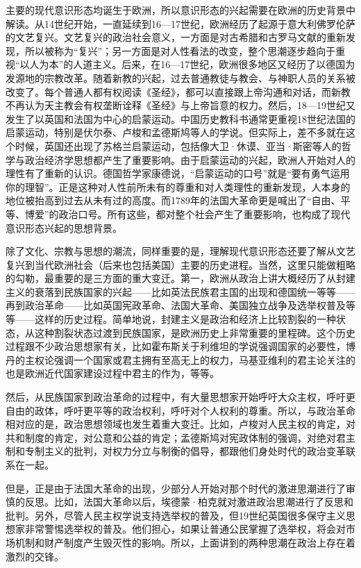 主要的现代意识形态均诞生于欧洲，所以意识形态的兴起需要在欧洲的历史背景中解读。从14世纪开始，一直延续到16—17世纪，欧洲经历了起源于意大利佛罗伦萨的文艺复兴。文艺复兴的政治社会意义，一方面是对古希腊和古罗马文献的重新发现，所以被称为“复兴”；另一方面是对人性看法的改变，整个思潮逐步趋向于重视“以人为本”的人道主义。后来，在16—17世纪，欧洲很多地区又经历了以德国为发源地的宗教改革。随着新教的兴起，过去普通教徒与教会、与神职人员的关系被改变了。每个普通人都有权阅读《圣经》，都可以直接跟上帝沟通和对话，而新教不再认为天主教会有权垄断诠释《圣经》与上帝旨意的权力。然后，18—19世纪又发生了以英国和法国为中心的启蒙运动。中国历史教科书通常更重视18世纪法国的启蒙运动，特别是伏尔泰、卢梭和孟德斯鸠等人的学说。但实际上，差不多就在这个时候，英国还出现了苏格兰启蒙运动，包括像大卫·休谟、亚当·斯密等人的哲学与政治经济学思想都产生了重要影响。由于启蒙运动的兴起，欧洲人开始对人的理性有了重新的认识。德国哲学家康德说，“启蒙运动的口号”就是“要有勇气运用你的理智”。正是这种对人性前所未有的尊重和对人类理性的重新发现，人本身的地位被抬高到过去从未有过的高度。而1789年的法国大革命更是喊出了“自由、平等、博爱”的政治口号。所有这些，都对整个社会产生了重要影响，也构成了现代意识形态兴起的思想背景。

除了文化、宗教与思想的潮流，同样重要的是，理解现代意识形态还要了解从文艺复兴到当代欧洲社会（后来也包括美国）主要的历史进程。当然，这里只能做粗略的勾勒，最重要的是三方面的重大变迁。第一，欧洲从政治上讲大概经历了从封建主义的衰落到民族国家的兴起——比如英法民族君主国的出现和德国统一等等——再到政治革命——比如英国宪政革命、法国大革命、美国独立战争及选举权普及等等——这样的历史过程。简单地说，封建主义是政治和经济上比较割裂的一种状态，从这种割裂状态过渡到民族国家，是欧洲历史上非常重要的里程碑。这个历史过程跟不少政治思想家有关，比如霍布斯关于利维坦的学说强调国家的必要性，博丹的主权论强调一个国家或君主拥有至高无上的权力，马基亚维利的君主论关注的也是欧洲近代国家建设过程中君主的作为，等等。

然后，从民族国家到政治革命的过程中，有大量思想家开始呼吁大众主权，呼吁更自由的政体，呼吁更平等的政治权利，呼吁对个人权利的尊重。所以，与政治革命相对应的是，政治思想领域也发生着重大变迁。比如，卢梭对人民主权的肯定，对共和制度的肯定，对公意和公益的肯定；孟德斯鸠对宪政体制的强调，对绝对君主制和专制主义的批判，对权力分立与制衡的倡导，都跟他们身处时代的政治变革联系在一起。

但是，正是由于法国大革命的出现，少部分人开始对那个时代的激进思潮进行了审慎的反思。比如，法国大革命以后，埃德蒙·柏克就对激进政治思潮进行了反思和批判。另外，尽管人民主权学说支持选举权的普及，但19世纪英国很多保守主义思想家非常警惕选举权的普及。他们担心，如果让普通公民掌握了选举权，将会对市场机制和财产制度产生毁灭性的影响。所以，上面讲到的两种思潮在政治上存在着激烈的交锋。

